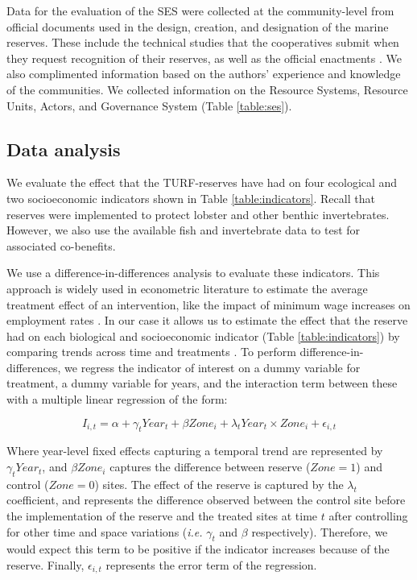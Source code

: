 \documentclass{frontiersSCNS}
\begin{document}
Data for the evaluation of the SES were collected at the community-level
from official documents used in the design, creation, and designation of
the marine reserves. These include the technical studies that the
cooperatives submit when they request recognition of their reserves, as
well as the official enactments
\citep{dof_website_2012,dof_website_2013,dof_website_2018}. We also
complimented information based on the authors' experience and knowledge
of the communities. We collected information on the Resource Systems,
Resource Units, Actors, and Governance System (Table \ref{table:ses}).

\hypertarget{data-analysis}{%
\subsection{Data analysis}\label{data-analysis}}

We evaluate the effect that the TURF-reserves have had on four
ecological and two socioeconomic indicators shown in Table
\ref{table:indicators}. Recall that reserves were implemented to protect
lobster and other benthic invertebrates. However, we also use the
available fish and invertebrate data to test for associated co-benefits.

We use a difference-in-differences analysis to evaluate these
indicators. This approach is widely used in econometric literature to
estimate the average treatment effect of an intervention, like the
impact of minimum wage increases on employment rates \citep{card_1994}.
In our case it allows us to estimate the effect that the reserve had on
each biological and socioeconomic indicator (Table
\ref{table:indicators}) by comparing trends across time and treatments
\citep{moland_2013,Villasenor-Derbez_2018}. To perform
difference-in-differences, we regress the indicator of interest on a
dummy variable for treatment, a dummy variable for years, and the
interaction term between these with a multiple linear regression of the
form:

\begin{equation}
I_{i,t} = \alpha + \gamma_{t} Year_t + \beta Zone_i + \lambda_{t} Year_t\times Zone_i + \epsilon_{i,t}
\label{eqn:reg_bio}
\end{equation}

Where year-level fixed effects capturing a temporal trend are
represented by \(\gamma_t Year_t\), and \(\beta Zone_i\) captures the
difference between reserve (\(Zone = 1\)) and control (\(Zone = 0\))
sites. The effect of the reserve is captured by the \(\lambda_t\)
coefficient, and represents the difference observed between the control
site before the implementation of the reserve and the treated sites at
time \(t\) after controlling for other time and space variations
(\emph{i.e.} \(\gamma_t\) and \(\beta\) respectively). Therefore, we
would expect this term to be positive if the indicator increases because
of the reserve. Finally, \(\epsilon_{i,t}\) represents the error term of
the regression.
\end{document}
